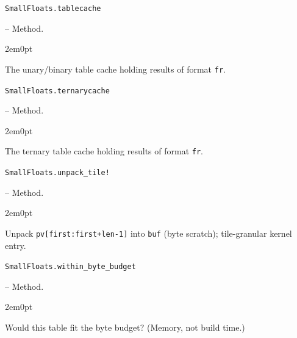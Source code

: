 \par\medskip\noindent\begin{minipage}{\linewidth}
\hypertarget{3948079286591090344}{\texttt{SmallFloats.tablecache}}  -- {Method.}
\nopagebreak
\begin{adjustwidth}{2em}{0pt}

The unary/binary table cache holding results of format \texttt{fr}.



\end{adjustwidth}
\end{minipage}
\par\medskip

\par\medskip\noindent\begin{minipage}{\linewidth}
\hypertarget{17327739502832920628}{\texttt{SmallFloats.ternarycache}}  -- {Method.}
\nopagebreak
\begin{adjustwidth}{2em}{0pt}

The ternary table cache holding results of format \texttt{fr}.



\end{adjustwidth}
\end{minipage}
\par\medskip

\par\medskip\noindent\begin{minipage}{\linewidth}
\hypertarget{2228068531026386954}{\texttt{SmallFloats.unpack\_\allowbreak{}tile!}}  -- {Method.}
\nopagebreak
\begin{adjustwidth}{2em}{0pt}

Unpack \texttt{pv[first:first+len-1]} into \texttt{buf} (byte scratch); tile-granular kernel entry.



\end{adjustwidth}
\end{minipage}
\par\medskip

\par\medskip\noindent\begin{minipage}{\linewidth}
\hypertarget{8374399003204767242}{\texttt{SmallFloats.within\_\allowbreak{}byte\_\allowbreak{}budget}}  -- {Method.}
\nopagebreak
\begin{adjustwidth}{2em}{0pt}

Would this table fit the byte budget? (Memory, not build time.)



\end{adjustwidth}
\end{minipage}
\par\medskip


